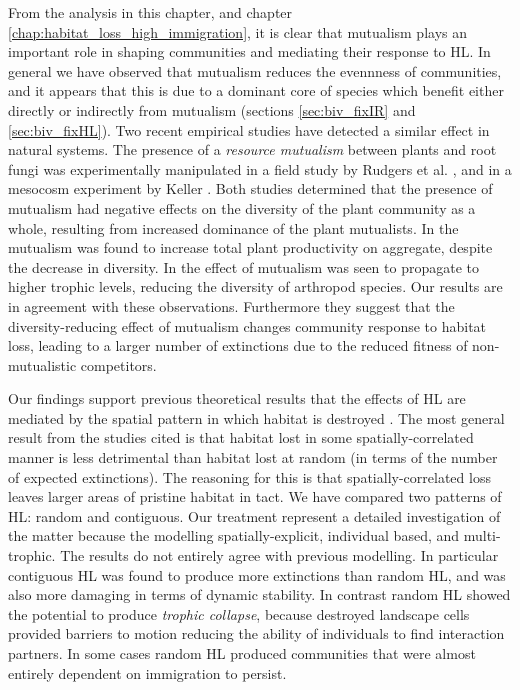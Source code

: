 From the analysis in this chapter, and chapter \ref{chap:habitat_loss_high_immigration}, it is clear that mutualism plays an important role in shaping communities and mediating their response to HL. In general we have observed that mutualism reduces the evennness of communities, and it appears that this is due to a dominant core of species which benefit either directly or indirectly from mutualism (sections \ref{sec:biv_fixIR} and \ref{sec:biv_fixHL}). Two recent empirical studies have detected a similar effect in natural systems. The presence of a \emph{resource mutualism} between plants and root fungi was experimentally manipulated in a field study by Rudgers et al. \cite{rudgers2008invasive}, and in a mesocosm experiment by Keller \cite{keller2014mutualistic}. Both studies determined that the presence of mutualism had negative effects on the diversity of the plant community as a whole, resulting from increased dominance of the plant mutualists. In \cite{keller2014mutualistic} the mutualism was found to increase total plant productivity on aggregate, despite the decrease in diversity. In \cite{rudgers2008invasive} the effect of mutualism was seen to propagate to higher trophic levels, reducing the diversity of arthropod species. Our results are in agreement with these observations. Furthermore	they suggest that the diversity-reducing effect of mutualism changes community response to habitat loss, leading to a larger number of extinctions due to the reduced fitness of non-mutualistic competitors. 

Our findings support previous theoretical results that the effects of HL are mediated by the spatial pattern in which habitat is destroyed \cite{allen2007self,jager2006simulated,dytham1995effect,
hill1999habitat,travis2003climate,with1999extinction,ovaskainen2002metapopulation}. The most general result from the studies cited is that habitat lost in some spatially-correlated manner is less detrimental than habitat lost at random (in terms of the number of expected extinctions). The reasoning for this is that spatially-correlated loss leaves larger areas of pristine habitat in tact. We have compared two patterns of HL: random and contiguous. Our treatment represent a detailed investigation of the matter because the modelling spatially-explicit, individual based, and multi-trophic. The results do not entirely agree with previous modelling. In particular contiguous HL was found to produce more extinctions than random HL, and was also more damaging in terms of dynamic stability. In contrast random HL showed the potential to produce \emph{trophic collapse}, because destroyed landscape cells provided barriers to motion reducing the ability of individuals to find interaction partners. In some cases random HL produced communities that were almost entirely dependent on immigration to persist.

